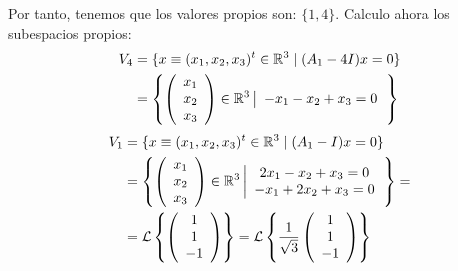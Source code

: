 \begin{ejercicio}
\begin{enumerate}
        Por tanto, tenemos que los valores propios son: $\{1,4\}$. Calculo ahora los subespacios propios:
        \begin{equation*}\begin{split}
            V_4 &= \{x\equiv(x_1,x_2,x_3)^t\in \mathbb{R}^3 \mid (A_1-4I)x=0\}    \\
            &= \left\{\left(\begin{array}{c}
                x_1 \\ x_2 \\ x_3 
            \end{array}\right) \in \mathbb{R}^3 \left|\begin{array}{c}
                -x_1-x_2+x_3=0 \\
            \end{array}\right.
            \right\}
        \end{split}\end{equation*}
        \begin{equation*}\begin{split}
            V_1 &= \{x\equiv(x_1,x_2,x_3)^t\in \mathbb{R}^3 \mid (A_1-I)x=0\}    \\
            &= \left\{\left(\begin{array}{c}
                x_1 \\ x_2 \\ x_3 
            \end{array}\right) \in \mathbb{R}^3 \left|\begin{array}{c}
                2x_1-x_2+x_3=0 \\
                -x_1+2x_2+x_3=0 \\
            \end{array}\right.
            \right\}=
            \\&= \mathcal{L}\left\{\left(\begin{array}{c}
                1 \\ 1 \\ -1 
            \end{array}\right)\right\} = \mathcal{L}\left\{\frac{1}{\sqrt{3}}\left(\begin{array}{c}
                1 \\ 1 \\ -1 
            \end{array}\right)\right\}
        \end{split}\end{equation*}


\end{enumerate}
\end{ejercicio}
